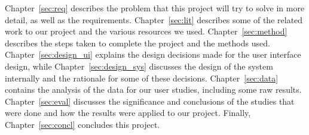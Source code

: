 \begin{doublespace}
Chapter~\ref{sec:req} describes the problem that this project will try to solve in more detail, as well as the requirements. Chapter~\ref{sec:lit} describes some of the related work to our project and the various resources we used. Chapter~\ref{sec:method} describes the steps taken to complete the project and the methods used. Chapter~\ref{sec:design_ui} explains the design decisions made for the user interface design, while Chapter~\ref{sec:design_sys} discusses the design of the system internally and the rationale for some of these decisions. Chapter~\ref{sec:data} contains the analysis of the data for our user studies, including some raw results. Chapter~\ref{sec:eval} discusses the significance and conclusions of the studies that were done and how the results were applied to our project. Finally, Chapter~\ref{sec:concl} concludes this project.

\end{doublespace}